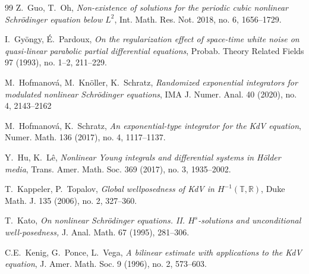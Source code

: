 \documentclass[letterpaper, 11pt,  reqno]{amsart}
\newcommand{\1}{\hspace{0.5mm}\text{I}\hspace{0.5mm}}
\newcommand{\R}{\mathbb{R}}
\newcommand{\T}{\mathbb{T}}
\numberwithin{equation}{section}
\numberwithin{theorem}{section}
\begin{document}
\begin{thebibliography}{99}
Z.~Guo,  T.~Oh, 
{\it Non-existence of solutions for the periodic cubic nonlinear Schr\"odinger equation below $L^2$}, Int. Math. Res. Not. 2018, no. 6, 1656--1729. 




I.~Gy\"ongy,  \'E.~Pardoux, 
    {\it On the regularization effect of space-time white noise on quasi-linear parabolic partial differential equations},
    Probab. Theory Related Fields 97 (1993), no. 1--2, 211--229.





M.~Hofmanov\'a, M.~Kn\"oller, K.~Schratz,
{\it Randomized exponential integrators for modulated nonlinear Schr\"odinger equations}, IMA J. Numer. Anal. 40 (2020), no. 4, 2143--2162

M.~Hofmanov\'a,  K.~Schratz,
{\it An exponential-type integrator for the KdV equation},  Numer. Math. 136 (2017), no. 4, 1117--1137.


Y.~Hu, K.~L\^e, 
{\it Nonlinear Young integrals and differential systems in H\"older media},
 Trans. Amer. Math. Soc. 369 (2017), no. 3, 1935--2002. 


T.~Kappeler, P.~Topalov,
{\it Global wellposedness of KdV in $H^{-1}(\T, \R)$},
Duke Math. J. 135 (2006), no. 2, 327--360.




T.~Kato, {\it On nonlinear Schr\"odinger equations. II. $H^s$-solutions and unconditional
well-posedness,} J. Anal. Math. 67 (1995), 281--306.




%
%
%




C.E.~Kenig, G.~Ponce, L.~Vega,
{\it A bilinear estimate with applications to the KdV equation},
J. Amer. Math. Soc. 9 (1996), no. 2, 573--603.







\end{thebibliography}
\end{document}

